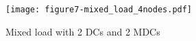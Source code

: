 \begin{figure}[tb]
  \begin{center}
    \texttt{[image: figure7-mixed\_load\_4nodes.pdf]}
    \vspace{-2.0ex}
    \caption{Mixed load with 2 DCs and 2 MDCs}
    \label{fig:mixed}
  \end{center}
\end{figure}






